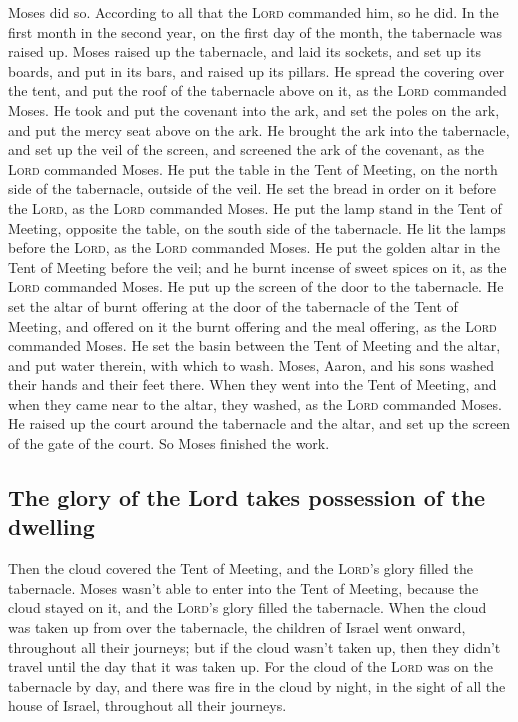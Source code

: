  Moses did so. According to all that the \textsc{Lord}
commanded him, so he did.  In the first month in the
second year, on the first day of the month, the tabernacle was raised
up.  Moses raised up the tabernacle, and laid its
sockets, and set up its boards, and put in its bars, and raised up its
pillars.  He spread the covering over the tent, and put
the roof of the tabernacle above on it, as the \textsc{Lord} commanded
Moses.  He took and put the covenant into the ark, and
set the poles on the ark, and put the mercy seat above on the ark.
 He brought the ark into the tabernacle, and set up the
veil of the screen, and screened the ark of the covenant, as the
\textsc{Lord} commanded Moses.  He put the table in the
Tent of Meeting, on the north side of the tabernacle, outside of the
veil.  He set the bread in order on it before the
\textsc{Lord}, as the \textsc{Lord} commanded Moses.  He
put the lamp stand in the Tent of Meeting, opposite the table, on the
south side of the tabernacle.  He lit the lamps before
the \textsc{Lord}, as the \textsc{Lord} commanded Moses. 
He put the golden altar in the Tent of Meeting before the veil;
 and he burnt incense of sweet spices on it, as the
\textsc{Lord} commanded Moses.  He put up the screen of
the door to the tabernacle.  He set the altar of burnt
offering at the door of the tabernacle of the Tent of Meeting, and
offered on it the burnt offering and the meal offering, as the
\textsc{Lord} commanded Moses.  He set the basin between
the Tent of Meeting and the altar, and put water therein, with which to
wash.  Moses, Aaron, and his sons washed their hands and
their feet there.  When they went into the Tent of
Meeting, and when they came near to the altar, they washed, as the
\textsc{Lord} commanded Moses.  He raised up the court
around the tabernacle and the altar, and set up the screen of the gate
of the court. So Moses finished the work.

\hypertarget{the-glory-of-the-lord-takes-possession-of-the-dwelling}{%
\subsection{The glory of the Lord takes possession of the
dwelling}\label{the-glory-of-the-lord-takes-possession-of-the-dwelling}}

 Then the cloud covered the Tent of Meeting, and the
\textsc{Lord}'s glory filled the tabernacle.  Moses
wasn't able to enter into the Tent of Meeting, because the cloud stayed
on it, and the \textsc{Lord}'s glory filled the tabernacle.
 When the cloud was taken up from over the tabernacle,
the children of Israel went onward, throughout all their journeys;
 but if the cloud wasn't taken up, then they didn't
travel until the day that it was taken up.  For the cloud
of the \textsc{Lord} was on the tabernacle by day, and there was fire in
the cloud by night, in the sight of all the house of Israel, throughout
all their journeys.
